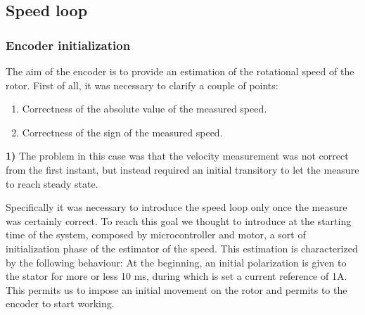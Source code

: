 \documentclass[12pt]{article}
\begin{document}
\subsection{Speed loop}
\subsubsection*{Encoder initialization}
The aim of the encoder is to provide an estimation of the rotational speed of the rotor.
First of all, it was necessary to clarify a couple of points:
\begin{enumerate}
\item Correctness of the absolute value of the measured speed.
\item Correctness of the sign of the measured speed.
\end{enumerate}
\textbf{1)} The problem in this case was that the velocity measurement was not correct from the first instant, but instead required an initial transitory to let the measure to reach steady state. 


Specifically it was necessary to introduce the speed loop only once the measure was certainly correct.
To reach this goal we thought to introduce at the starting time of the system, composed by microcontroller and motor, a sort of initialization phase of the estimator of the speed. This estimation is characterized by the following behaviour:
At the beginning, an initial polarization is given to the stator for more or less 10 ms, during which is set a current reference of 1A. This permits us to impose an initial movement on the rotor and permits to the encoder to start working. 
\end{document}
